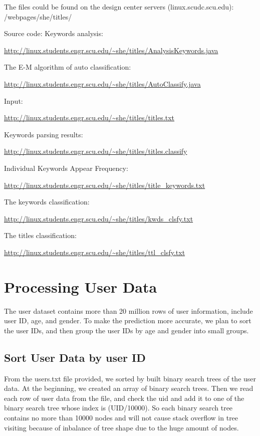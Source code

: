 \documentclass{article} %
\begin{document}
The files could be found on the design center servers (linux.scudc.scu.edu): /webpages/she/titles/

Source code:
Keywords analysis:
\begin{center}
  \url{http://linux.students.engr.scu.edu/~she/titles/AnalysisKeywords.java}
\end{center}

The E-M algorithm of auto classification:
\begin{center}
  \url{http://linux.students.engr.scu.edu/~she/titles/AutoClassify.java}
\end{center}

Input:
\begin{center}
  \url{http://linux.students.engr.scu.edu/~she/titles/titles.txt}
\end{center}

Keywords parsing results:
\begin{center}
  \url{http://linux.students.engr.scu.edu/~she/titles/titles.classify}
\end{center}

Individual Keywords Appear Frequency:
\begin{center}
  \url{http://linux.students.engr.scu.edu/~she/titles/title_keywords.txt}
\end{center}

The keywords classification:
\begin{center}
  \url{http://linux.students.engr.scu.edu/~she/titles/kwds_clsfy.txt}
\end{center}

The titles classification:
\begin{center}
  \url{http://linux.students.engr.scu.edu/~she/titles/ttl_clsfy.txt}
\end{center}

\section{Processing User Data}
The user dataset contains more than 20 million rows of user information, include user ID, age, and gender. To make the prediction more accurate, we plan to sort the user IDs, and then group the user IDs by age and gender into small groups.

\subsection{Sort User Data by user ID}

From the users.txt file provided, we sorted by built binary search trees of the user data. At the beginning, we created an array of binary search trees. Then we read each row of user data from the file, and check the uid and add it to one of the binary search tree whose index is (UID/10000). So each binary search tree contains no more than 10000 nodes and will not cause stack overflow in tree visiting because of inbalance of tree shape due to the huge amount of nodes.
\end{document}
